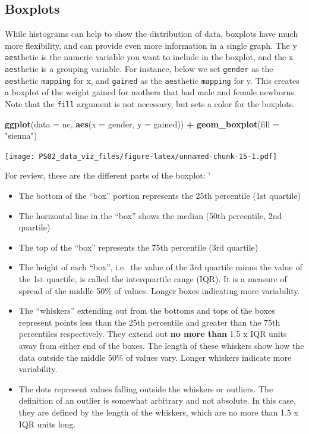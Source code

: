 \documentclass[]{article}
\newenvironment{Shaded}{\begin{snugshade}}{\end{snugshade}}
\newcommand{\DataTypeTok}[1]{\textcolor[rgb]{0.13,0.29,0.53}{#1}}
\newcommand{\KeywordTok}[1]{\textcolor[rgb]{0.13,0.29,0.53}{\textbf{#1}}}
\newcommand{\NormalTok}[1]{#1}
\newcommand{\OperatorTok}[1]{\textcolor[rgb]{0.81,0.36,0.00}{\textbf{#1}}}
\newcommand{\StringTok}[1]{\textcolor[rgb]{0.31,0.60,0.02}{#1}}
\providecommand{\tightlist}{%
  \setlength{\itemsep}{0pt}\setlength{\parskip}{0pt}}
\begin{document}
\hypertarget{boxplots}{%
\subsection{Boxplots}\label{boxplots}}

While histograms can help to show the distribution of data, boxplots
have much more flexibility, and can provide even more information in a
single graph. The y \texttt{aes}thetic is the numeric variable you want
to include in the boxplot, and the x \texttt{aes}thetic is a grouping
variable. For instance, below we set \texttt{gender} as the
\texttt{aes}thetic \texttt{mapping} for x, and \texttt{gained} as the
\texttt{aes}thetic \texttt{mapping} for y. This creates a boxplot of the
weight gained for mothers that had male and female newborns. Note that
the \texttt{fill} argument is not necessary, but sets a color for the
boxplots.

\begin{Shaded}
\begin{Highlighting}[]
\KeywordTok{ggplot}\NormalTok{(}\DataTypeTok{data =}\NormalTok{ nc, }\KeywordTok{aes}\NormalTok{(}\DataTypeTok{x =}\NormalTok{ gender, }\DataTypeTok{y =}\NormalTok{ gained)) }\OperatorTok{+}
\StringTok{  }\KeywordTok{geom_boxplot}\NormalTok{(}\DataTypeTok{fill =} \StringTok{"sienna"}\NormalTok{)}
\end{Highlighting}
\end{Shaded}

\texttt{[image: PS02\_data\_viz\_files/figure-latex/unnamed-chunk-15-1.pdf]}

\leavevmode\hypertarget{license}{}%
For review, these are the different parts of the boxplot: '

\begin{itemize}
\tightlist
\item
  The bottom of the ``box'' portion represents the 25th percentile (1st
  quartile)
\item
  The horizontal line in the ``box'' shows the median (50th percentile,
  2nd quartile)
\item
  The top of the ``box'' represents the 75th percentile (3rd quartile)
\item
  The height of each ``box'', i.e.~the value of the 3rd quartile minus
  the value of the 1st quartile, is called the interquartile range
  (IQR). It is a measure of spread of the middle 50\% of values. Longer
  boxes indicating more variability.
\item
  The ``whiskers'' extending out from the bottoms and tops of the boxes
  represent points less than the 25th percentile and greater than the
  75th percentiles respectively. They extend out \textbf{no more than}
  1.5 x IQR units away from either end of the boxes. The length of these
  whiskers show how the data outside the middle 50\% of values vary.
  Longer whiskers indicate more variability.
\item
  The dots represent values falling outside the whiskers or outliers.
  The definition of an outlier is somewhat arbitrary and not absolute.
  In this case, they are defined by the length of the whiskers, which
  are no more than 1.5 x IQR units long.
\end{itemize}
\end{document}
